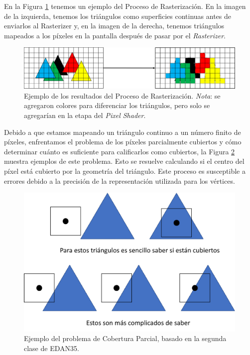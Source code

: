 \documentclass{cslthse-msc}
\begin{document}
En la Figura \ref{fig:rasterizationproc} tenemos un ejemplo del Proceso de Rasterización. En la imagen de la izquierda, tenemos los triángulos como superficies continuas antes de enviarlos al Rasterizer y, en la imagen de la derecha, tenemos triángulos mapeados a los píxeles en la pantalla después de pasar por el \textit{Rasterizer}.

\begin{figure}[!hbt]
	\centering
	\includegraphics[scale=0.75]{images/rasterization_process.png} 
	\caption{Ejemplo de los resultados del Proceso de Rasterización.
		\emph{Nota}: se agregaron colores para diferenciar los triángulos, pero solo se agregarían en la etapa del \textit{Pixel Shader}.
	}\label{fig:rasterizationproc}
\end{figure}

Debido a que estamos mapeando un triángulo continuo a un número finito de píxeles, enfrentamos el problema de los píxeles parcialmente cubiertos y cómo determinar cuánto es suficiente para calificarlos como cubiertos, la Figura \ref{fig:partialcover} muestra ejemplos de este problema. Esto se resuelve calculando si el centro del píxel está cubierto por la geometría del triángulo. Este proceso es susceptible a errores debido a la precisión de la representación utilizada para los vértices.

\begin{figure}[!hbt]
	\centering
	\includegraphics[scale=0.5]{images/edge_testing.png} 
	\caption{Ejemplo del problema de Cobertura Parcial, basado en la segunda clase de EDAN35. ~\cite{Doggett2017EDAN35}}\label{fig:partialcover}
\end{figure}
\end{document}
